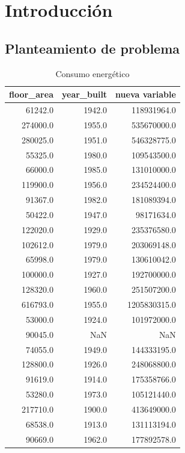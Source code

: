\section[Introducción]{Introducción}

\lipsum[1-3]
\lista{
    \item \lipsum[1]
    \item \lipsum[1]
}


\lipsum[1]
\subsection{Planteamiento de problema}

\lipsum[1-3]

\begin{table}[h!]
    \centering
    \begin{tabular}{rrr}
\toprule
 floor\_area &  year\_built &  nueva variable \\
\midrule
    61242.0 &      1942.0 &     118931964.0 \\
   274000.0 &      1955.0 &     535670000.0 \\
   280025.0 &      1951.0 &     546328775.0 \\
    55325.0 &      1980.0 &     109543500.0 \\
    66000.0 &      1985.0 &     131010000.0 \\
   119900.0 &      1956.0 &     234524400.0 \\
    91367.0 &      1982.0 &     181089394.0 \\
    50422.0 &      1947.0 &      98171634.0 \\
   122020.0 &      1929.0 &     235376580.0 \\
   102612.0 &      1979.0 &     203069148.0 \\
    65998.0 &      1979.0 &     130610042.0 \\
   100000.0 &      1927.0 &     192700000.0 \\
   128320.0 &      1960.0 &     251507200.0 \\
   616793.0 &      1955.0 &    1205830315.0 \\
    53000.0 &      1924.0 &     101972000.0 \\
    90045.0 &         NaN &             NaN \\
    74055.0 &      1949.0 &     144333195.0 \\
   128800.0 &      1926.0 &     248068800.0 \\
    91619.0 &      1914.0 &     175358766.0 \\
    53280.0 &      1973.0 &     105121440.0 \\
   217710.0 &      1900.0 &     413649000.0 \\
    68538.0 &      1913.0 &     131113194.0 \\
    90669.0 &      1962.0 &     177892578.0 \\
\bottomrule
\end{tabular}
    \caption{Consumo energético}
    \label{tab:my_label}
\end{table}

